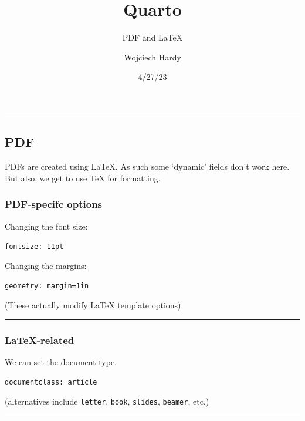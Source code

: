 \documentclass[
  11pt,
]{article}
\title{Quarto}
\subtitle{PDF and LaTeX}
\author{Wojciech Hardy}
\date{4/27/23}
\begin{document}
\maketitle
\ifdefined\Shaded\renewenvironment{Shaded}{\begin{tcolorbox}[enhanced, borderline west={3pt}{0pt}{shadecolor}, frame hidden, sharp corners, breakable, interior hidden, boxrule=0pt]}{\end{tcolorbox}}\fi

\begin{center}\rule{0.5\linewidth}{0.5pt}\end{center}

\hypertarget{pdf}{%
\subsection{PDF}\label{pdf}}

PDFs are created using LaTeX. As such some `dynamic' fields don't work
here. But also, we get to use TeX for formatting.

\hypertarget{pdf-specifc-options}{%
\subsubsection{PDF-specifc options}\label{pdf-specifc-options}}

Changing the font size:

\texttt{fontsize:\ 11pt}

Changing the margins:

\texttt{geometry:\ margin=1in}

(These actually modify LaTeX template options).

\begin{center}\rule{0.5\linewidth}{0.5pt}\end{center}

\hypertarget{latex-related}{%
\subsubsection{LaTeX-related}\label{latex-related}}

We can set the document type.

\texttt{documentclass:\ article}

(alternatives include \texttt{letter}, \texttt{book}, \texttt{slides},
\texttt{beamer}, etc.)

\begin{center}\rule{0.5\linewidth}{0.5pt}\end{center}
\end{document}
